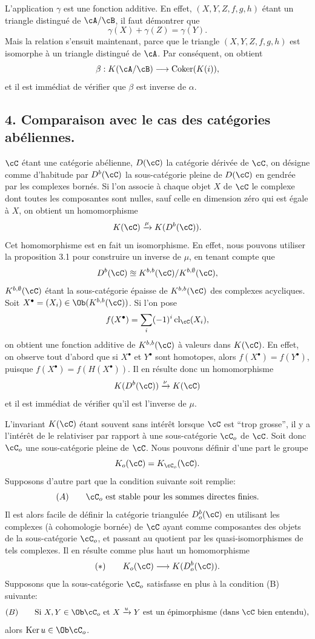 L'application $\gamma$ est une fonction additive. En effet, $(X,Y,Z,f,g,h)$ étant un triangle distingué de $\cA/\cB$, il faut démontrer que
\[
\gamma(X)+\gamma(Z)=\gamma(Y).
\]
Mais la relation s'ensuit maintenant, parce que le triangle $(X,Y,Z,f,g,h)$ est isomorphe à un triangle distingué de $\cA$. Par conséquent, on obtient
\[
\beta:K(\cA/\cB)\longrightarrow \operatorname{Coker}(K(i)),
\]
et il est immédiat de vérifier que $\beta$ est inverse de $\alpha$.

\subsection*{4. Comparaison avec le cas des catégories abéliennes.}

$\cC$ étant une catégorie abélienne, $D(\cC)$ la catégorie dérivée de $\cC$, on désigne comme d'habitude par $D^b(\cC)$ la sous-catégorie pleine de $D(\cC)$ 
en%
gendrée par les
complexes bornés. Si l'on associe à chaque objet $X$ de $\cC$ le complexe dont toutes les composantes sont nulles, sauf celle en dimension zéro qui est égale à $X$, on obtient un homomorphisme
\[
K(\cC)\xrightarrow{\mu}K(D^b(\cC)).
\]
Cet homomorphisme est en fait un isomorphisme. En effet, nous pouvons utiliser la proposition 3.1 pour construire un inverse de $\mu$, en tenant compte que
\[
D^b(\cC)\approxeq K^{b,b}(\cC)/K^{b,\emptyset}(\cC),
\]
$K^{b,\emptyset}(\cC)$ étant la sous-catégorie épaisse de $K^{b,b}(\cC)$ des complexes acycliques. Soit $X^\bullet=(X_i)\in\Ob(K^{b,b}(\cC))$. Si l'on pose
\[
f(X^\bullet)=\sum_i(-1)^i\operatorname{cl}_{\cC}(X_i),
\]
on obtient une fonction additive de $K^{b,b}(\cC)$ à valeurs dans $K(\cC)$. En effet, on observe tout d'abord que si $X^\bullet$ et $Y^\bullet$ sont homotopes, alors $f(X^\bullet)=f(Y^\bullet)$, puisque $f(X^\bullet)=f(H(X^\bullet))$. Il en résulte donc un homomorphisme
\[
K(D^b(\cC))\xrightarrow{\nu}K(\cC)
\]
et il est immédiat de vérifier qu'il est l'inverse de $\mu$.

L'invariant $K(\cC)$ étant souvent sans intérêt lorsque $\cC$ est ``trop grosse'', il y a l'intérêt de le relativiser par rapport à une sous-catégorie $\cC_o$ de $\cC$. Soit donc $\cC_o$ une sous-catégorie pleine de $\cC$. Nous pouvons définir d'une part le groupe
\[
K_o(\cC)=K_{\cC_o}(\cC).
\]
Supposons d'autre part que la condition suivante soit remplie:
\[
(A)\qquad \cC_o\text{ est stable pour les sommes directes finies.}
\]
Il est alors facile de définir la catégorie triangulée $D_o^b(\cC)$ en utilisant les complexes (à cohomologie bornée) de $\cC$ ayant comme composantes des objets de la sous-catégorie $\cC_o$, et passant au
quotient par les quasi-isomorphismes de tels complexes. Il en résulte comme plus haut un homomorphisme
\[
(*)\qquad K_o(\cC)\longrightarrow K(D_o^b(\cC)).
\]
Supposons que la sous-catégorie $\cC_o$ satisfasse en plus à la condition (B) suivante:
\[
(B)\qquad
\text{Si }X,Y\in\Ob\cC_o\text{ et }X\xrightarrow{u}Y
\text{ est un épimorphisme (dans }\cC\text{ bien entendu)},
\]
alors $\operatorname{Ker}u\in\Ob\cC_o$.

